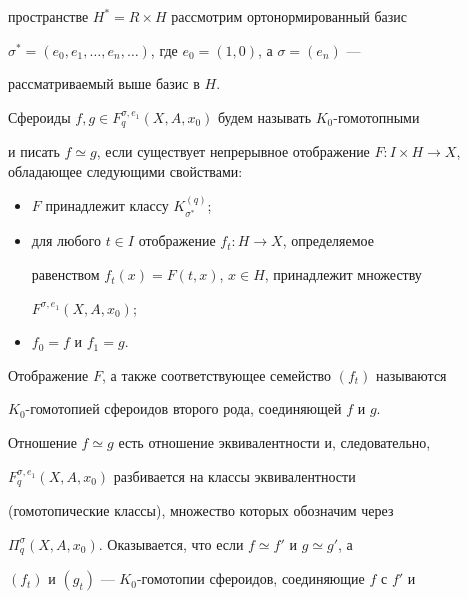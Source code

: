 пространстве $H^*=R\times H$ рассмотрим ортонормированный базис 


$\sigma^*=(e_0,e_1,\dotsc,e_n,\dotsc)$, где $e_0=(1,0)$, а $\sigma=(e_n)$ --- 


рассматриваемый выше базис в $H$. 


 


\begin{defn} 


Сфероиды $f,g\in F^{\sigma,e_1}_q(X,A,x_0)$ будем называть $K_0$-гомотопными 


и писать $f\simeq g$, если существует непрерывное отображение $F:I\times 


H\to X$, обладающее следующими свойствами: 


\begin{itemize} 


\item[1)] $F$ принадлежит классу $K^{(q)}_{\sigma^*}$; 


\item[2)] для любого $t\in I$ отображение $f_t:H\to X$, определяемое 


равенством $f_t(x)=F(t,x)$, $x\in H$, принадлежит множеству 


$F^{\sigma,e_1}(X,A,x_0)$; 


\item[3)] $f_0=f$ и $f_1=g$. 


\end{itemize} 


 


Отображение $F$, а также соответствующее семейство $(f_t)$ называются 


$K_0$-гомотопией сфероидов второго рода, соединяющей $f$ и $g$. 


\end{defn} 


 


Отношение $f\simeq g$ есть отношение эквивалентности и, следовательно, 


$F^{\sigma,e_1}_q(X,A,x_0)$ разбивается на классы эквивалентности 


(гомотопические классы), множество которых обозначим через 


$\Pi^\sigma_q(X,A,x_0)$. Оказывается, что если $f\simeq f'$ и $g\simeq g'$, а 


$(f_t)$ и $(g_t)$ --- $K_0$-гомотопии сфероидов, соединяющие $f$ с $f'$ и 


